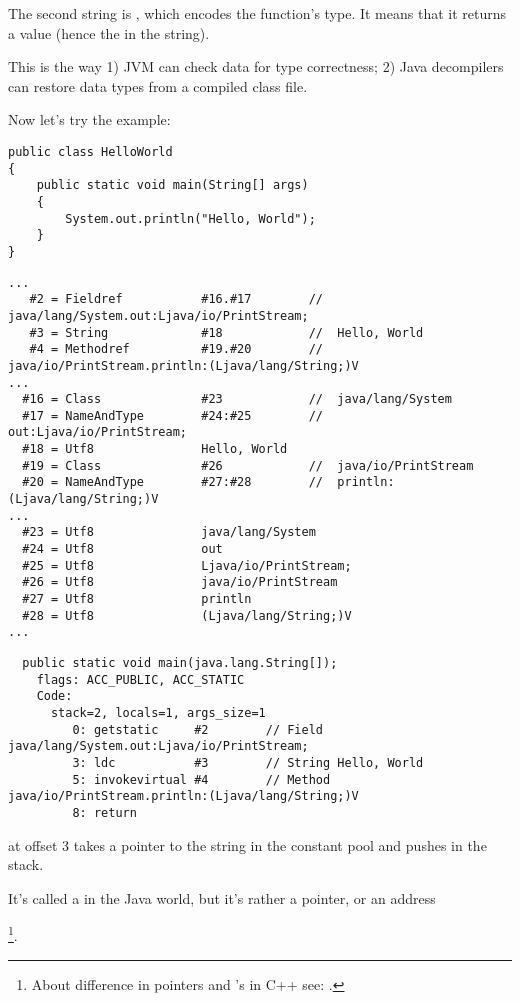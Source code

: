 The second string is , which encodes the function's type.
It means that it returns a  value (hence the  in the string).

This is the way 
1) JVM can check data for type correctness; 
2) Java decompilers can restore data types from a compiled class file.


Now let's try the  example:


\begin{lstlisting}
public class HelloWorld
{
	public static void main(String[] args)
	{
		System.out.println("Hello, World");
	}
}
\end{lstlisting}

\begin{lstlisting}[caption=Constant pool]
...
   #2 = Fieldref           #16.#17        //  java/lang/System.out:Ljava/io/PrintStream;
   #3 = String             #18            //  Hello, World
   #4 = Methodref          #19.#20        //  java/io/PrintStream.println:(Ljava/lang/String;)V
...
  #16 = Class              #23            //  java/lang/System
  #17 = NameAndType        #24:#25        //  out:Ljava/io/PrintStream;
  #18 = Utf8               Hello, World
  #19 = Class              #26            //  java/io/PrintStream
  #20 = NameAndType        #27:#28        //  println:(Ljava/lang/String;)V
...
  #23 = Utf8               java/lang/System
  #24 = Utf8               out
  #25 = Utf8               Ljava/io/PrintStream;
  #26 = Utf8               java/io/PrintStream
  #27 = Utf8               println
  #28 = Utf8               (Ljava/lang/String;)V
...
\end{lstlisting}

\begin{lstlisting}
  public static void main(java.lang.String[]);
    flags: ACC_PUBLIC, ACC_STATIC
    Code:
      stack=2, locals=1, args_size=1
         0: getstatic     #2        // Field java/lang/System.out:Ljava/io/PrintStream;
         3: ldc           #3        // String Hello, World
         5: invokevirtual #4        // Method java/io/PrintStream.println:(Ljava/lang/String;)V
         8: return        
\end{lstlisting}

 at offset 3 takes a pointer to the  string in the constant pool
and pushes in the stack.

It's called a  in the Java world, but it's rather a pointer, or an address

\footnote{About difference in pointers and 's in C++ see: .}.

